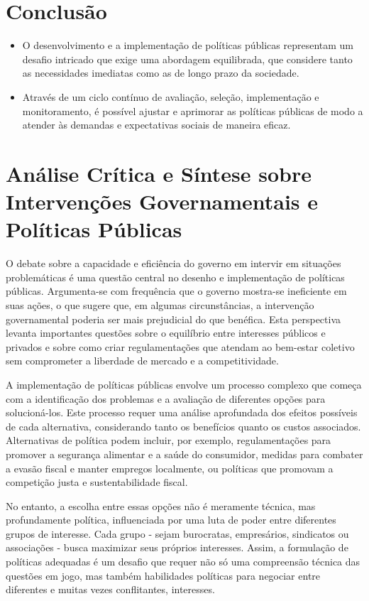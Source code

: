 \documentclass[
   article,       
   12pt,          
   oneside,       
   a4paper,       
   english,       
   brazil,        
   sumario=tradicional
   ]{abntex2}
\begin{document}
\section{Conclusão}
\begin{itemize}
\item O desenvolvimento e a implementação de políticas públicas representam um desafio intricado que exige uma abordagem equilibrada, que considere tanto as necessidades imediatas como as de longo prazo da sociedade.
\item Através de um ciclo contínuo de avaliação, seleção, implementação e monitoramento, é possível ajustar e aprimorar as políticas públicas de modo a atender às demandas e expectativas sociais de maneira eficaz.
\end{itemize}
\section{Análise Crítica e Síntese sobre Intervenções Governamentais e Políticas Públicas}

O debate sobre a capacidade e eficiência do governo em intervir em situações problemáticas é uma questão central no desenho e implementação de políticas públicas. Argumenta-se com frequência que o governo mostra-se ineficiente em suas ações, o que sugere que, em algumas circunstâncias, a intervenção governamental poderia ser mais prejudicial do que benéfica. Esta perspectiva levanta importantes questões sobre o equilíbrio entre interesses públicos e privados e sobre como criar regulamentações que atendam ao bem-estar coletivo sem comprometer a liberdade de mercado e a competitividade.

A implementação de políticas públicas envolve um processo complexo que começa com a identificação dos problemas e a avaliação de diferentes opções para solucioná-los. Este processo requer uma análise aprofundada dos efeitos possíveis de cada alternativa, considerando tanto os benefícios quanto os custos associados. Alternativas de política podem incluir, por exemplo, regulamentações para promover a segurança alimentar e a saúde do consumidor, medidas para combater a evasão fiscal e manter empregos localmente, ou políticas que promovam a competição justa e sustentabilidade fiscal.

No entanto, a escolha entre essas opções não é meramente técnica, mas profundamente política, influenciada por uma luta de poder entre diferentes grupos de interesse. Cada grupo - sejam burocratas, empresários, sindicatos ou associações - busca maximizar seus próprios interesses. Assim, a formulação de políticas adequadas é um desafio que requer não só uma compreensão técnica das questões em jogo, mas também habilidades políticas para negociar entre diferentes e muitas vezes conflitantes, interesses.
\end{document}
